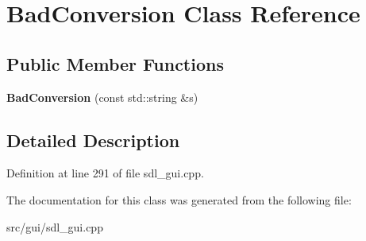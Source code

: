 \hypertarget{classBadConversion}{\section{Bad\-Conversion Class Reference}
\label{classBadConversion}
}
\subsection*{Public Member Functions}
\begin{DoxyCompactItemize}
\item 
\hypertarget{classBadConversion_acf304d65e2a3f8a7ff2aa489ca3f28d6}{{\bfseries Bad\-Conversion} (const std\-::string \&s)}\label{classBadConversion_acf304d65e2a3f8a7ff2aa489ca3f28d6}

\end{DoxyCompactItemize}


\subsection{Detailed Description}


Definition at line 291 of file sdl\-\_\-gui.\-cpp.



The documentation for this class was generated from the following file\-:\begin{DoxyCompactItemize}
\item 
src/gui/sdl\-\_\-gui.\-cpp\end{DoxyCompactItemize}
